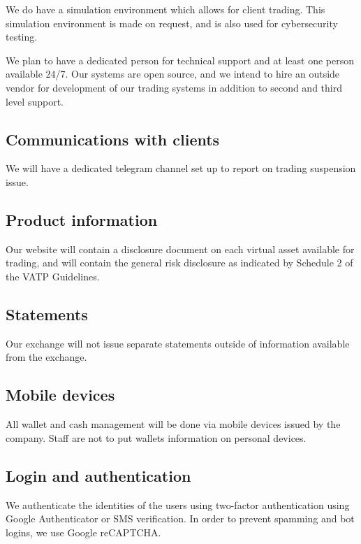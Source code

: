 We do have a simulation environment which allows for client
trading.  This simulation environment is made on request, and is also
used for cybersecurity testing.

We plan to have a dedicated person for technical support and at least
one person available 24/7.  Our systems are open source, and we intend
to hire an outside vendor for development of our trading systems in
addition to second and third level support.

\subsection{Communications with clients}
We will have a dedicated telegram channel set up to report on trading
suspension issue.

\subsection{Product information}
Our website will contain a disclosure document on each virtual asset
available for trading, and will contain the general risk disclosure
as indicated by Schedule 2 of the VATP Guidelines.

\subsection{Statements}
Our exchange will not issue separate statements outside of information
available from the exchange.

\subsection{Mobile devices}
All wallet and cash management will be done via mobile devices issued
by the company.  Staff are not to put wallets information on personal
devices.

\subsection{Login and authentication}

We authenticate the identities of the users using two-factor
authentication using Google Authenticator or SMS verification.  In
order to prevent spamming and bot logins, we use Google reCAPTCHA.

